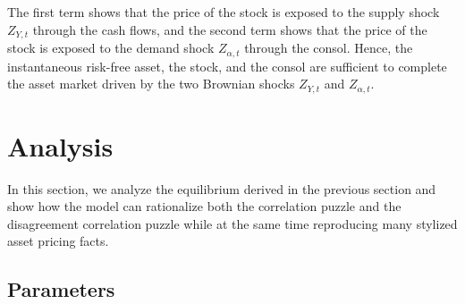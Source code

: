\documentclass[preprint,11pt,authoryear]{elsarticle}
\theoremstyle{plain}
\begin{document}
 
The first term shows that the price of the stock is exposed to the supply shock $Z_{Y,t}$ through the cash flows, and the second term shows that the price of the stock is exposed to the demand shock $Z_{\alpha,t}$ through the consol. Hence, the instantaneous risk-free asset, the stock, and the consol are sufficient to complete the asset market driven by the two Brownian shocks $Z_{Y,t}$ and $Z_{\alpha,t}$. 


\section{Analysis} \label{sec:analysis}

In this section, we analyze the equilibrium derived in the previous section and show how the model can rationalize both the correlation puzzle and the disagreement correlation puzzle while at the same time reproducing many stylized asset pricing facts.

\subsection{Parameters}
\end{document}
